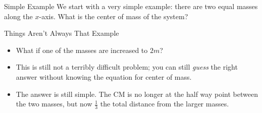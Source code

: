 \documentclass[12pt,compress,aspectratio=169]{beamer}
\begin{document}
\begin{frame}{Simple Example}
  We start with a very simple example: there are two equal masses along the
  $x$-axis. What is the center of mass of the system?
    
  \vspace{.25in}
  \begin{center}
  \end{center}
  \vspace{.2in}

\end{frame}

 
\begin{frame}{Things Aren't Always That Example}
  \begin{itemize}
  \item What if one of the masses are increased to $2m$?
  \item This is still not a terribly difficult problem; you can still
    \emph{guess} the right answer without knowing the equation for center of
    mass.
    
    \vspace{.25in}
    \begin{center}
    \end{center}
    \vspace{.15in}

  \item<2-> The answer is still simple. The CM is no longer at the half way
    point between the two masses, but now $\frac{1}{3}$ the total distance from
    the larger masses.
  \end{itemize}
\end{frame}
\end{document}
